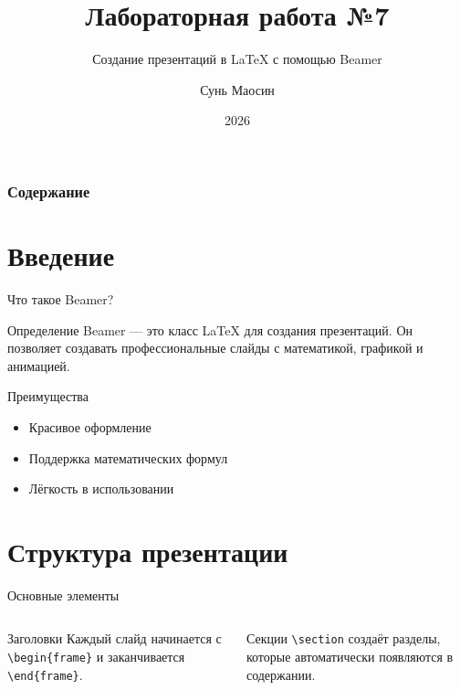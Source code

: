 \documentclass[14pt]{beamer}
\title{Лабораторная работа №7}
\subtitle{Создание презентаций в LaTeX с помощью Beamer}
\author{Сунь Маосин}
\institute{Российский университет дружбы народов}
\date{2026}
\begin{document}
\begin{frame}
  \titlepage
\end{frame}

\begin{frame}
  \frametitle{Содержание}
  \tableofcontents
\end{frame}

\section{Введение}

\begin{frame}{Что такое Beamer?}
  \begin{block}{Определение}
    Beamer — это класс LaTeX для создания презентаций.
    Он позволяет создавать профессиональные слайды с математикой, графикой и анимацией.
  \end{block}
  
  \begin{exampleblock}{Преимущества}
    \begin{itemize}
      \item Красивое оформление
      \item Поддержка математических формул
      \item Лёгкость в использовании
    \end{itemize}
  \end{exampleblock}
\end{frame}

\section{Структура презентации}

\begin{frame}{Основные элементы}
  \begin{columns}
      \begin{block}{Заголовки}
        Каждый слайд начинается с 
        \texttt{\textbackslash begin\{frame\}} 
        и заканчивается 
        \texttt{\textbackslash end\{frame\}}.
      \end{block}
    
      \begin{block}{Секции}
        \texttt{\textbackslash section} создаёт разделы,
        которые автоматически появляются в содержании.
      \end{block}
  \end{columns}
\end{frame}
\end{document}

